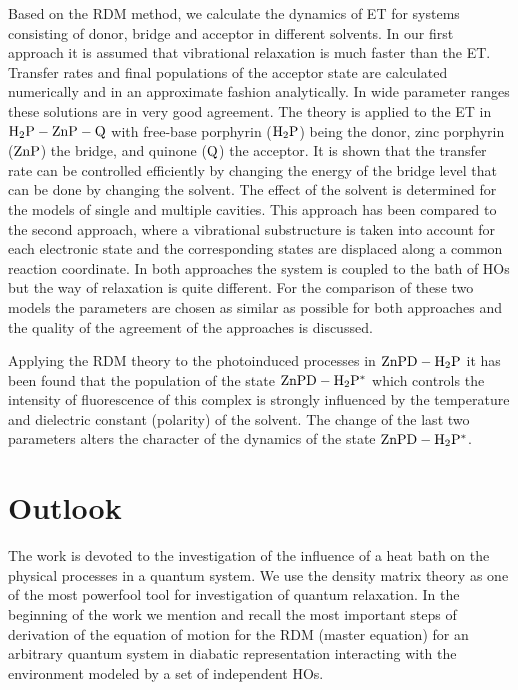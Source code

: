 \documentclass[12pt,twoside,a4paper]{report}
\begin{document}
{  Based on the RDM method, we 
calculate the dynamics of ET 
 for systems consisting of donor, bridge and acceptor
in different solvents.  
In our  first approach 
it is assumed that vibrational relaxation is
much faster than the ET. 
Transfer rates and final populations of the acceptor state 
are calculated 
numerically and in an approximate fashion analytically.
In wide parameter ranges these solutions are in very good agreement.
The theory is applied to the ET in
${\rm H_2P-ZnP-Q}$ with free-base porphyrin (${\rm H_2P}$) being the donor,
zinc porphyrin (${\rm ZnP}$) the bridge, and quinone (${\rm Q}$) the acceptor.
It is shown that the transfer rate can be controlled efficiently by changing
the energy of the bridge level that can be done by changing the solvent.
The effect of the solvent is determined for the models of single and multiple cavities.
This approach has been compared to
the second approach, where
a  vibrational substructure is taken into account for each electronic
  state and the corresponding states are displaced along a common
  reaction coordinate.  
In both
  approaches the system is coupled to the bath of HOs
  but the way of relaxation is quite different.  
For the comparison of these two models  the parameters are chosen as similar as possible for both approaches
  and the quality of the agreement of the approaches is discussed.


Applying the RDM theory to the photoinduced processes in ${\rm ZnPD-H_2P}$
it has been found that the population of the state ${\rm ZnPD-H_2P^*}$
which controls the intensity of fluorescence of this complex
is strongly influenced by the temperature and dielectric constant
(polarity) of the solvent. 
The change of the last two parameters alters the
character of the dynamics of the state  ${\rm ZnPD-H_2P^*}$.



\chapter*{}
\chapter{Outlook}
The work is devoted to the investigation of the influence of a heat bath
on the physical processes in a quantum system.
We use the density matrix theory as one of the
most powerfool tool for investigation of quantum relaxation.
In the beginning of the work we mention and recall the most important
steps of derivation of the equation of motion for the RDM
(master equation)
for an arbitrary quantum system in diabatic representation 
interacting with the environment modeled by a set of independent
HOs.


}
\end{document}
